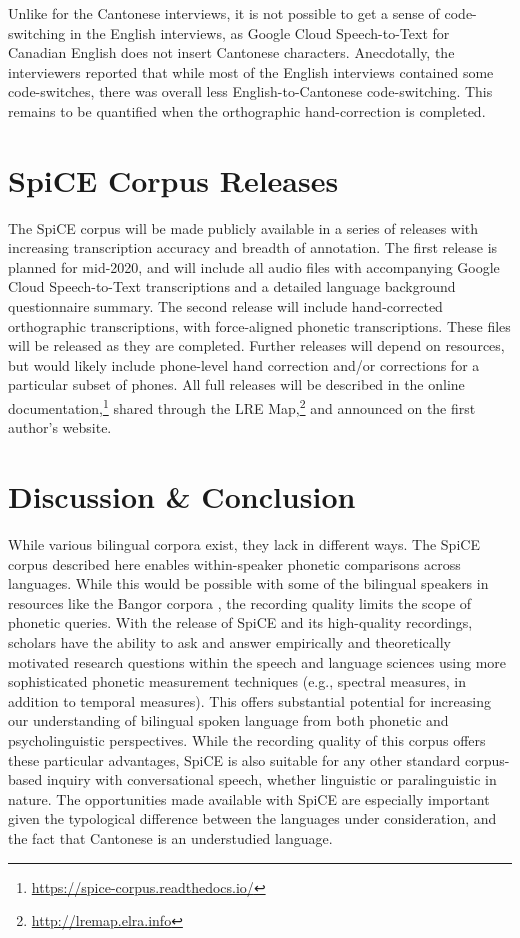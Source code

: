 Unlike for the Cantonese interviews, it is not possible to get a sense of code-switching in the English interviews, as Google Cloud Speech-to-Text for Canadian English does not insert Cantonese characters. Anecdotally, the interviewers reported that while most of the English interviews contained some code-switches, there was overall less English-to-Cantonese code-switching. This remains to be quantified when the orthographic hand-correction is completed.

\section{SpiCE Corpus Releases}\label{ch2:sec:releases}

The SpiCE corpus will be made publicly available in a series of releases with increasing transcription accuracy and breadth of annotation. The first release is planned for mid-2020, and will include all audio files with accompanying Google Cloud Speech-to-Text transcriptions and a detailed language background questionnaire summary. The second release will include hand-corrected orthographic transcriptions, with force-aligned phonetic transcriptions. These files will be released as they are completed. Further releases will depend on resources, but would likely include phone-level hand correction and/or corrections for a particular subset of phones. All full releases will be described in the online documentation,\footnote{\url{https://spice-corpus.readthedocs.io/}} shared through the LRE Map,\footnote{\url{http://lremap.elra.info}} and announced on the first author's website.

\section{Discussion \& Conclusion}\label{ch2:subsec:discussion}

While various bilingual corpora exist, they lack in different ways. The SpiCE corpus described here enables within-speaker phonetic comparisons across languages. While this would be possible with some of the bilingual speakers in resources like the Bangor corpora \citep{deuchar_2014_corpora}, the recording quality limits the scope of phonetic queries. With the release of SpiCE and its high-quality recordings, scholars have the ability to ask and answer empirically and theoretically motivated research questions within the speech and language sciences using more sophisticated phonetic measurement techniques (e.g., spectral measures, in addition to temporal measures). This offers substantial potential for increasing our understanding of bilingual spoken language from both phonetic and psycholinguistic perspectives. While the recording quality of this corpus offers these particular advantages, SpiCE is also suitable for any other standard corpus-based inquiry with conversational speech, whether linguistic or paralinguistic in nature. The opportunities made available with SpiCE are especially important given the typological difference between the languages under consideration, and the fact that Cantonese is an understudied language. 

\endinput %
